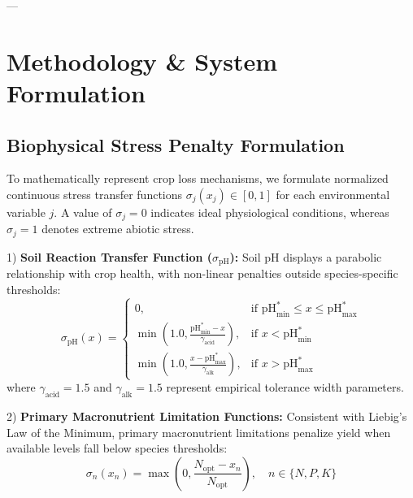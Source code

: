 \documentclass[conference]{IEEEtran}
\begin{document}
---

\section{Methodology \& System Formulation}

\subsection{Biophysical Stress Penalty Formulation}
To mathematically represent crop loss mechanisms, we formulate normalized continuous stress transfer functions $\sigma_j(x_j) \in [0, 1]$ for each environmental variable $j$. A value of $\sigma_j = 0$ indicates ideal physiological conditions, whereas $\sigma_j = 1$ denotes extreme abiotic stress.

1) \textbf{Soil Reaction Transfer Function ($\sigma_{\text{pH}}$):}
Soil pH displays a parabolic relationship with crop health, with non-linear penalties outside species-specific thresholds:
\begin{equation}
\sigma_{\text{pH}}(x) = \begin{cases}
0, & \text{if } \text{pH}_{\text{min}}^* \le x \le \text{pH}_{\text{max}}^* \\
\min\left(1.0, \frac{\text{pH}_{\text{min}}^* - x}{\gamma_{\text{acid}}}\right), & \text{if } x < \text{pH}_{\text{min}}^* \\
\min\left(1.0, \frac{x - \text{pH}_{\text{max}}^*}{\gamma_{\text{alk}}}\right), & \text{if } x > \text{pH}_{\text{max}}^*
\end{cases}
\end{equation}
where $\gamma_{\text{acid}} = 1.5$ and $\gamma_{\text{alk}} = 1.5$ represent empirical tolerance width parameters.

2) \textbf{Primary Macronutrient Limitation Functions:}
Consistent with Liebig's Law of the Minimum, primary macronutrient limitations penalize yield when available levels fall below species thresholds:
\begin{equation}
\sigma_n(x_n) = \max\left(0, \frac{N_{\text{opt}} - x_n}{N_{\text{opt}}}\right), \quad n \in \{N, P, K\}
\end{equation}
\end{document}
